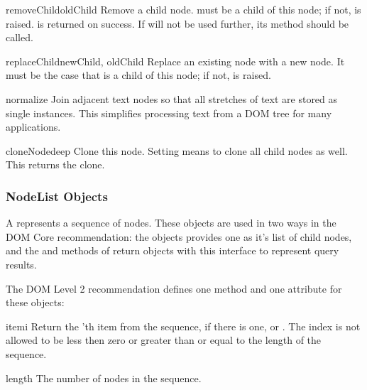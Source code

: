\begin{methoddesc}[Node]{removeChild}{oldChild}
Remove a child node.   must be a child of this node; if
not,  is raised.   is returned on
success.  If  will not be used further, its
 method should be called.
\end{methoddesc}

\begin{methoddesc}[Node]{replaceChild}{newChild, oldChild}
Replace an existing node with a new node. It must be the case that 
 is a child of this node; if not,
 is raised.
\end{methoddesc}

\begin{methoddesc}[Node]{normalize}{}
Join adjacent text nodes so that all stretches of text are stored as
single  instances.  This simplifies processing text from a
DOM tree for many applications.
\end{methoddesc}

\begin{methoddesc}[Node]{cloneNode}{deep}
Clone this node.  Setting  means to clone all child nodes as
well.  This returns the clone.
\end{methoddesc}


\subsubsection{NodeList Objects \label{dom-nodelist-objects}}

A  represents a sequence of nodes.  These objects are
used in two ways in the DOM Core recommendation:  the
 objects provides one as it's list of child nodes, and
the  and
 methods of  return
objects with this interface to represent query results.

The DOM Level 2 recommendation defines one method and one attribute
for these objects:

\begin{methoddesc}[NodeList]{item}{i}
  Return the 'th item from the sequence, if there is one, or
  .  The index  is not allowed to be less then zero
  or greater than or equal to the length of the sequence.
\end{methoddesc}

\begin{memberdesc}[NodeList]{length}
  The number of nodes in the sequence.
\end{memberdesc}

